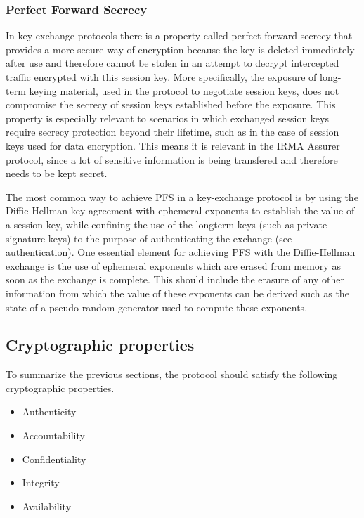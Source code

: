 \subsubsection{Perfect Forward Secrecy}
\label{subsubsec:pfs}
In key exchange protocols there is a property called perfect forward secrecy that provides a more secure way of encryption because the key is deleted immediately after use and therefore cannot be stolen in an attempt to decrypt intercepted traffic encrypted with this session key. More specifically, the exposure of long-term keying material, used in the protocol to negotiate session keys, does not compromise the secrecy of session keys established before the exposure. This property is especially relevant to scenarios in which exchanged session keys require secrecy protection beyond their lifetime, such as in the case of session keys used for data encryption. This means it is relevant in the IRMA Assurer protocol, since a lot of sensitive information is being transfered and therefore needs to be kept secret.

The most common way to achieve PFS in a key-exchange protocol is by using the Diffie-Hellman key agreement with ephemeral exponents to establish the value of a session key, while confining the use of the longterm keys (such as private signature keys) to the purpose of authenticating the exchange (see authentication). One essential element for achieving PFS with the Diffie-Hellman exchange is the use of ephemeral exponents which are erased from memory as soon as the exchange is complete. This should include the erasure of any other information from which the value of these exponents can be derived such as the state of a pseudo-random generator used to compute these exponents.~\cite{PFS}

\subsection{Cryptographic properties}
To summarize the previous sections, the protocol should satisfy the following cryptographic properties.
\begin{itemize}
  \item Authenticity
  \item Accountability
  \item Confidentiality
  \item Integrity
  \item Availability
\end{itemize}

